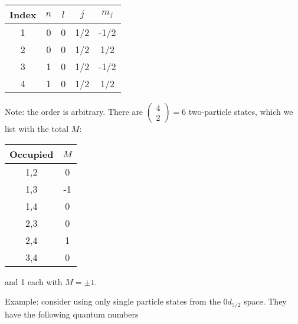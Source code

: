 \documentclass[graybox,sectrefs,envcountresetchap,open=right]{svmonodo}
\begin{document}
{\small   %

\vspace{4mm}

\begin{tabular}{ccccc}
\hline
\multicolumn{1}{c}{ Index } & \multicolumn{1}{c}{ $n$ } & \multicolumn{1}{c}{ $l$ } & \multicolumn{1}{c}{ $j$ } & \multicolumn{1}{c}{ $m_j$ } \\
\hline
1     & 0   & 0   & 1/2 & -1/2  \\
2     & 0   & 0   & 1/2 & 1/2   \\
3     & 1   & 0   & 1/2 & -1/2  \\
4     & 1   & 0   & 1/2 & 1/2   \\
\hline
\end{tabular}

\vspace{4mm}

}


\noindent
Note: the order is arbitrary.
There are $\left ( \begin{array}{c} 4 \\ 2 \end{array} \right) = 6$ two-particle states, 
which we list with the total $M$:



{\small   %

\vspace{4mm}

\begin{tabular}{cc}
\hline
\multicolumn{1}{c}{ Occupied } & \multicolumn{1}{c}{ $M$ } \\
\hline
1,2      & 0   \\
1,3      & -1  \\
1,4      & 0   \\
2,3      & 0   \\
2,4      & 1   \\
3,4      & 0   \\
\hline
\end{tabular}

\vspace{4mm}

}


\noindent
and 1 each with $M = \pm 1$.


Example: consider using only single particle states from the $0d_{5/2}$ space. 
They have the following quantum numbers
\end{document}
